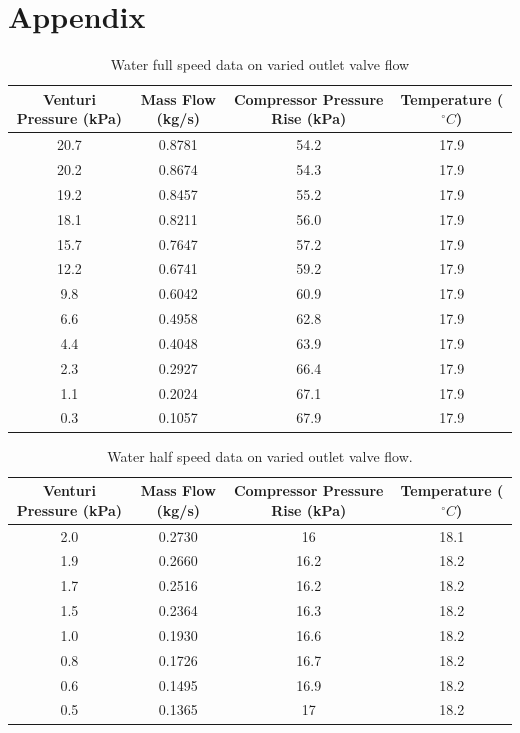 \documentclass{article}
\begin{document}

\section{Appendix}

\begin{table}[H]
    \centering
    \begin{tabular}{cccc}
        \hline
        Venturi Pressure (kPa) & Mass Flow (kg/s) & Compressor Pressure Rise (kPa) & Temperature ($^\circ C$)\\
        \hline
        20.7 & 0.8781 & 54.2 & 17.9 \\
        20.2 & 0.8674 & 54.3 & 17.9 \\
        19.2 & 0.8457 & 55.2 & 17.9 \\
        18.1 & 0.8211 & 56.0 & 17.9 \\
        15.7 & 0.7647 & 57.2 & 17.9 \\
        12.2 & 0.6741 & 59.2 & 17.9 \\
        9.8 & 0.6042 & 60.9 & 17.9 \\
        6.6 & 0.4958 & 62.8 & 17.9 \\
        4.4 & 0.4048 & 63.9 & 17.9 \\
        2.3 & 0.2927 & 66.4 & 17.9 \\
        1.1 & 0.2024 & 67.1 & 17.9 \\
        0.3 & 0.1057 & 67.9 & 17.9 \\
        \hline
    \end{tabular}
    \caption{Water full speed data on varied outlet valve flow}
    \label{tab:water_full_speed_outlet_data}
\end{table}

\begin{table}[H]
    \centering
    \begin{tabular}{cccc}
        \hline
        Venturi Pressure (kPa) & Mass Flow (kg/s) & Compressor Pressure Rise (kPa) & Temperature ($^\circ C$)\\        \hline
        2.0 & 0.2730 & 16 & 18.1 \\
        1.9 & 0.2660 & 16.2 & 18.2 \\
        1.7 & 0.2516 & 16.2 & 18.2 \\
        1.5 & 0.2364 & 16.3 & 18.2 \\
        1.0 & 0.1930 & 16.6 & 18.2 \\
        0.8 & 0.1726 & 16.7 & 18.2 \\
        0.6 & 0.1495 & 16.9 & 18.2 \\
        0.5 & 0.1365 & 17 & 18.2 \\
        \hline
    \end{tabular}
    \caption{Water half speed data on varied outlet valve flow.}
    \label{tab:water_half_speed_outlet_data}
\end{table}
\end{document}
